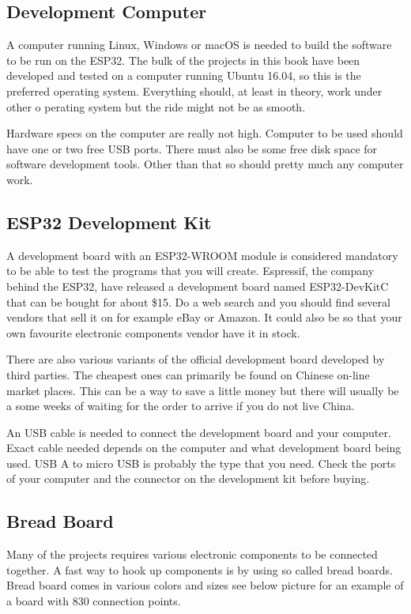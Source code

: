 \documentclass{tufte-book}
\begin{document}
\subsection{Development Computer}
A computer running Linux, Windows or macOS is needed to build the software to 
be run on the ESP32. The bulk of the projects in this book have been developed 
and tested on a computer running Ubuntu 16.04, so this is the preferred 
operating system. Everything should, at least in theory, work under other o
perating system but the ride might not be as smooth.

Hardware specs on the computer are really not high. Computer to be used should 
have one or two free USB ports. There must also be some free disk space for 
software development tools. Other than that so should pretty much any computer 
work.

\subsection{ESP32 Development Kit}
A development board with an ESP32-WROOM module is considered mandatory to be 
able to test the programs that you will create. Espressif, the company behind 
the ESP32, have released a development board named ESP32-DevKitC that can be 
bought for about \$15. Do a web search and you should find several vendors that 
sell it on for example eBay or Amazon. It could also be so that your own 
favourite electronic components vendor have it in stock.

There are also various variants of the official development board developed by 
third parties. The cheapest ones can primarily be found on Chinese on-line 
market places. This can be a way to save a little money but there will usually 
be a some weeks of waiting for the order to arrive if you do not live China.

An USB cable is needed to connect the development board and your computer. 
Exact cable needed depends on the computer and what development board being 
used. USB A to micro USB is probably the type that you need. Check the ports of 
your computer and the connector on the development kit before buying.

\subsection{Bread Board}
Many of the projects requires various electronic components to be connected 
together. A fast way to hook up components is by using so called bread boards. 
Bread board comes in various colors and sizes see below picture for an example 
of a board with 830 connection points.
\end{document}
